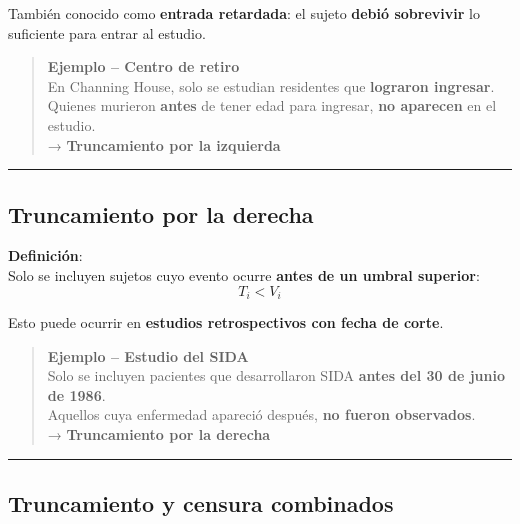 \documentclass[
  letterpaper,
  DIV=11,
  numbers=noendperiod]{scrartcl}
\begin{document}
También conocido como \textbf{entrada retardada}: el sujeto
\textbf{debió sobrevivir} lo suficiente para entrar al estudio.

\begin{quote}
\textbf{Ejemplo -- Centro de retiro}\\
En Channing House, solo se estudian residentes que \textbf{lograron
ingresar}.\\
Quienes murieron \textbf{antes} de tener edad para ingresar, \textbf{no
aparecen} en el estudio.\\
→ \textbf{Truncamiento por la izquierda}
\end{quote}

\begin{center}\rule{0.5\linewidth}{0.5pt}\end{center}

\subsection{Truncamiento por la
derecha}\label{truncamiento-por-la-derecha}

\textbf{Definición}:\\
Solo se incluyen sujetos cuyo evento ocurre \textbf{antes de un umbral
superior}: \[
T_i < V_i
\]

Esto puede ocurrir en \textbf{estudios retrospectivos con fecha de
corte}.

\begin{quote}
\textbf{Ejemplo -- Estudio del SIDA}\\
Solo se incluyen pacientes que desarrollaron SIDA \textbf{antes del 30
de junio de 1986}.\\
Aquellos cuya enfermedad apareció después, \textbf{no fueron
observados}.\\
→ \textbf{Truncamiento por la derecha}
\end{quote}

\begin{center}\rule{0.5\linewidth}{0.5pt}\end{center}

\subsection{Truncamiento y censura
combinados}\label{truncamiento-y-censura-combinados}
\end{document}
